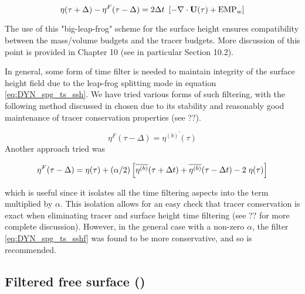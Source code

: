 \documentclass[../main/NEMO_manual]{subfiles}
\begin{document}
{\begin{equation}
  \label{eq:DYN_spg_ts_ssh}
  \eta(\tau+\Delta) - \eta^{F}(\tau-\Delta) = 2\Delta t \ \left[ - \nabla \cdot \textbf{U}(\tau) + \text{EMP}_w \right]  
\end{equation}

The use of this "big-leap-frog" scheme for the surface height ensures compatibility between
the mass/volume budgets and the tracer budgets.
More discussion of this point is provided in Chapter 10 (see in particular Section 10.2). 
 
In general, some form of time filter is needed to maintain integrity of the surface height field due to
the leap-frog splitting mode in equation \autoref{eq:DYN_spg_ts_ssh}.
We have tried various forms of such filtering,
with the following method discussed in \cite{Griffies_al_MWR01} chosen due to
its stability and reasonably good maintenance of tracer conservation properties (see ??).

\begin{equation}
  \label{eq:DYN_spg_ts_sshf}
  \eta^{F}(\tau-\Delta) =  \overline{\eta^{(b)}(\tau)}
\end{equation}
Another approach tried was 

\[
  \eta^{F}(\tau-\Delta) = \eta(\tau)
  + (\alpha/2) \left[\overline{\eta^{(b)}}(\tau+\Delta t)
    + \overline{\eta^{(b)}}(\tau-\Delta t) -2 \;\eta(\tau) \right]
\]

which is useful since it isolates all the time filtering aspects into the term multiplied by $\alpha$.
This isolation allows for an easy check that tracer conservation is exact when
eliminating tracer and surface height time filtering (see ?? for more complete discussion).
However, in the general case with a non-zero $\alpha$,
the filter \autoref{eq:DYN_spg_ts_sshf} was found to be more conservative, and so is recommended. 

}            %



\subsection{Filtered free surface (\protect{})}
\label{subsec:DYN_spg_fltp}
\end{document}
